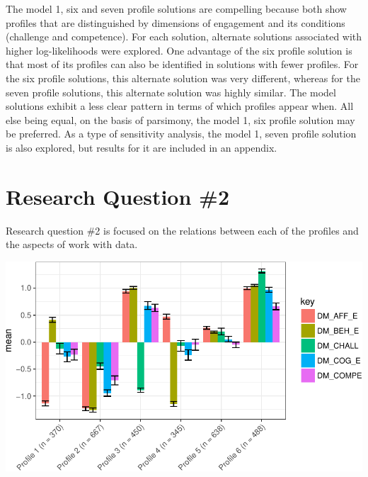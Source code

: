 \documentclass[]{msu-thesis}
\theoremstyle{definition}
\theoremstyle{definition}
\theoremstyle{definition}
\theoremstyle{remark}
\begin{document}
The model 1, six and seven profile solutions are compelling because both
show profiles that are distinguished by dimensions of engagement and its
conditions (challenge and competence). For each solution, alternate
solutions associated with higher log-likelihoods were explored. One
advantage of the six profile solution is that most of its profiles can
also be identified in solutions with fewer profiles. For the six profile
solutions, this alternate solution was very different, whereas for the
seven profile solutions, this alternate solution was highly similar. The
model solutions exhibit a less clear pattern in terms of which profiles
appear when. All else being equal, on the basis of parsimony, the model
1, six profile solution may be preferred. As a type of sensitivity
analysis, the model 1, seven profile solution is also explored, but
results for it are included in an appendix.

\section{Research Question \#2}\label{research-question-2}

Research question \#2 is focused on the relations between each of the
profiles and the aspects of work with data.

\begin{center}\includegraphics[width=0.8\linewidth]{rosenberg-dissertation_files/figure-latex/rq2-proc-1} \end{center}
\end{document}
